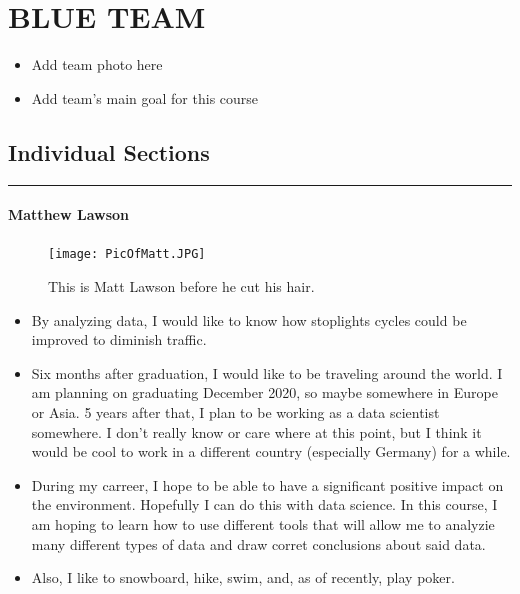 \documentclass[]{article}
\title{}
\author{}
\date{}
\providecommand{\tightlist}{%
  \setlength{\itemsep}{0pt}\setlength{\parskip}{0pt}}
\let\oldparagraph\paragraph
\renewcommand{\paragraph}[1]{\oldparagraph{#1}\mbox{}}
\begin{document}
\section{BLUE TEAM}\label{blue-team}

\begin{itemize}
\tightlist
\item
  Add team photo here
\item
  Add team's main goal for this course
\end{itemize}

\subsection{Individual Sections}\label{individual-sections}

\begin{center}\rule{0.5\linewidth}{\linethickness}\end{center}

\paragraph{Matthew Lawson}\label{matthew-lawson}

\begin{figure}
\centering
\texttt{[image: PicOfMatt.JPG]}
\caption{This is Matt Lawson before he cut his hair.}
\end{figure}

\begin{itemize}
\item
  By analyzing data, I would like to know how stoplights cycles could be
  improved to diminish traffic.
\item
  Six months after graduation, I would like to be traveling around the
  world. I am planning on graduating December 2020, so maybe somewhere
  in Europe or Asia. 5 years after that, I plan to be working as a data
  scientist somewhere. I don't really know or care where at this point,
  but I think it would be cool to work in a different country
  (especially Germany) for a while.
\item
  During my carreer, I hope to be able to have a significant positive
  impact on the environment. Hopefully I can do this with data science.
  In this course, I am hoping to learn how to use different tools that
  will allow me to analyzie many different types of data and draw corret
  conclusions about said data.
\item
  Also, I like to snowboard, hike, swim, and, as of recently, play
  poker.
\end{itemize}
\end{document}
